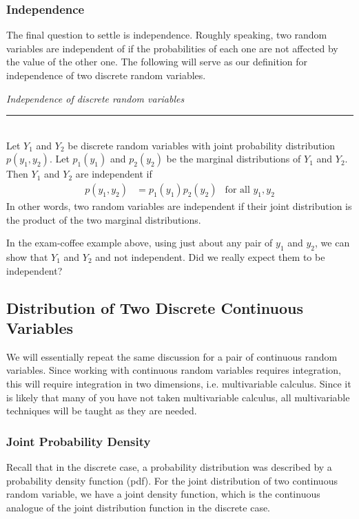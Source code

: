 \documentclass[12pt]{article}
\theoremstyle{definition}
\theoremstyle{remark}
\begin{document}
\subsubsection{Independence}
The final question to settle is independence. Roughly speaking, two random variables are independent of if the probabilities of each one are not affected by the value of the other one. The following will serve as our definition for independence of two discrete random variables.

\begin{framed}
\emph{Independence of discrete random variables}\\
  \rule{\dimexpr{}\fboxrule}{.1pt} \\
Let $Y_1$ and $Y_2$ be discrete random variables with joint probability distribution $p(y_1, y_2)$. Let $p_1(y_1)$ and $p_2(y_2)$ be the marginal distributions of $Y_1$ and $Y_2$. Then $Y_1$ and $Y_2$ are independent if
\begin{align*}
p(y_1, y_2) &= p_1(y_1)p_2(y_2) & \text{for all }y_1, y_2
\end{align*}
In other words, two random variables are independent if their joint distribution is the product of the two marginal distributions.
\end{framed}

In the exam-coffee example above, using just about any pair of $y_1$ and $y_2$, we can show that $Y_1$ and $Y_2$ and not independent. Did we really expect them to be independent?

\subsection{Distribution of Two Discrete Continuous Variables}
We will essentially repeat the same discussion for a pair of continuous random variables. Since working with continuous random variables requires integration, this will require integration in two dimensions, i.e. multivariable calculus. Since it is likely that many of you have not taken multivariable calculus, all multivariable techniques will be taught as they are needed.

\subsubsection{Joint Probability Density}
Recall that in the discrete case, a probability distribution was described by a probability density function (pdf). For the joint distribution of two continuous random variable, we have a joint density function, which is the continuous analogue of the joint distribution function in the discrete case.
\end{document}
